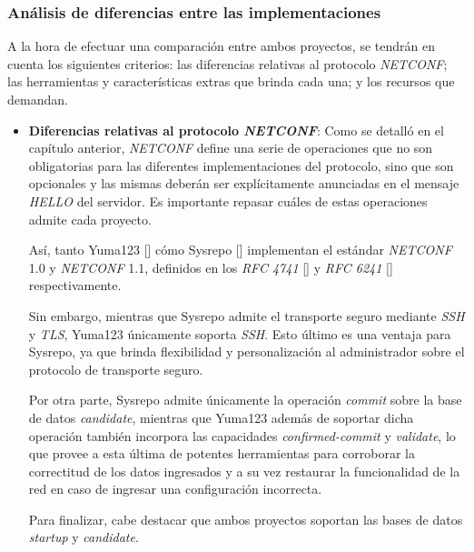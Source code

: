 \subsubsection{Análisis de diferencias entre las implementaciones}
A la hora de efectuar una comparación entre ambos proyectos, se tendrán en cuenta los siguientes criterios: las diferencias relativas al protocolo \textit{NETCONF}; las herramientas y características extras que brinda cada una; y los recursos que demandan.

\begin{itemize}
	\item \textbf{Diferencias relativas al protocolo \textit{NETCONF}}: Como se detalló en el capítulo anterior, \textit{NETCONF} define una serie de operaciones que no son obligatorias para las diferentes implementaciones del protocolo, sino que son opcionales y las mismas deberán ser explícitamente anunciadas en el mensaje \textit{HELLO} del servidor. Es importante repasar cuáles de estas operaciones admite cada proyecto. 
		
	Así, tanto Yuma123 [] cómo Sysrepo [] implementan el estándar \textit{NETCONF} 1.0 y \textit{NETCONF} 1.1, definidos en los \textit{RFC 4741} [] y \textit{RFC 6241} [] respectivamente. 
	
	Sin embargo, mientras que Sysrepo admite el transporte seguro mediante \textit{SSH} y \textit{TLS}, Yuma123 únicamente soporta \textit{SSH}. Esto último es una ventaja para Sysrepo, ya que brinda flexibilidad y personalización al administrador sobre el protocolo de transporte seguro.
	
	Por otra parte, Sysrepo admite únicamente la operación \textit{commit} sobre la base de datos \textit{candidate}, mientras que Yuma123 además de soportar dicha operación también incorpora las capacidades \textit{confirmed-commit} y \textit{validate}, lo que provee a esta última de potentes herramientas para corroborar la correctitud de los datos ingresados y a su vez restaurar la funcionalidad de la red en caso de ingresar una configuración incorrecta.
	
	Para finalizar, cabe destacar que ambos proyectos soportan las bases de datos \textit{startup} y \textit{candidate}.


\end{itemize}

